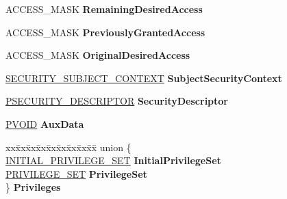 \begin{DoxyCompactItemize}
A\+C\+C\+E\+S\+S\+\_\+\+M\+A\+SK {\bfseries Remaining\+Desired\+Access}
\item 
\mbox{\label{struct___a_c_c_e_s_s___s_t_a_t_e_a5712ba2a1297f96e003d15029607ef48}} 
A\+C\+C\+E\+S\+S\+\_\+\+M\+A\+SK {\bfseries Previously\+Granted\+Access}
\item 
\mbox{\label{struct___a_c_c_e_s_s___s_t_a_t_e_a6815968e85776a2b1829f31593894e9c}} 
A\+C\+C\+E\+S\+S\+\_\+\+M\+A\+SK {\bfseries Original\+Desired\+Access}
\item 
\mbox{\label{struct___a_c_c_e_s_s___s_t_a_t_e_ad7d2cab8c06c9a4b09332526fda381b9}} 
\hyperlink{struct___s_e_c_u_r_i_t_y___s_u_b_j_e_c_t___c_o_n_t_e_x_t}{S\+E\+C\+U\+R\+I\+T\+Y\+\_\+\+S\+U\+B\+J\+E\+C\+T\+\_\+\+C\+O\+N\+T\+E\+XT} {\bfseries Subject\+Security\+Context}
\item 
\mbox{\label{struct___a_c_c_e_s_s___s_t_a_t_e_a66c3c156e29ac2726998a3a34a9d61fd}} 
\hyperlink{struct___s_e_c_u_r_i_t_y___d_e_s_c_r_i_p_t_o_r}{P\+S\+E\+C\+U\+R\+I\+T\+Y\+\_\+\+D\+E\+S\+C\+R\+I\+P\+T\+OR} {\bfseries Security\+Descriptor}
\item 
\mbox{\label{struct___a_c_c_e_s_s___s_t_a_t_e_a9adcf3d383bfb22b4d23f7591e4b70bf}} 
\hyperlink{interfacevoid}{P\+V\+O\+ID} {\bfseries Aux\+Data}
\item 
\mbox{\label{struct___a_c_c_e_s_s___s_t_a_t_e_afdf4123eb0e729ac52cc8f4ef0585b38}} 
\begin{tabbing}
xx\=xx\=xx\=xx\=xx\=xx\=xx\=xx\=xx\=\kill
union \{\\
\>\hyperlink{struct___i_n_i_t_i_a_l___p_r_i_v_i_l_e_g_e___s_e_t}{INITIAL\_PRIVILEGE\_SET} {\bfseries InitialPrivilegeSet}\\
\>\hyperlink{struct___p_r_i_v_i_l_e_g_e___s_e_t}{PRIVILEGE\_SET} {\bfseries PrivilegeSet}\\
\} {\bfseries Privileges}\\


\end{tabbing}
\end{DoxyCompactItemize}
